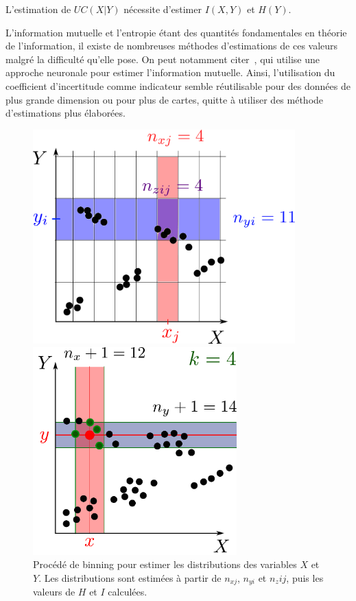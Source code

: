 L'estimation de $UC(X|Y)$ nécessite d'estimer $I(X,Y)$ et $H(Y)$.

L'information mutuelle et l'entropie étant des quantités fondamentales en théorie de l'information, il existe de nombreuses méthodes d'estimations de ces valeurs malgré la difficulté qu'elle pose. On peut notamment citer~\cite{Belghazi2018MutualIN}, qui utilise une approche neuronale pour estimer l'information mutuelle. Ainsi, l'utilisation du coefficient d'incertitude comme indicateur semble réutilisable pour des données de plus grande dimension ou pour plus de cartes, quitte à utiliser des méthode d'estimations plus élaborées. 

\begin{figure}
\begin{minipage}{0.45\textwidth}
\centering
\includegraphics[width=0.9\textwidth]{boxes}
\caption{Procédé de binning pour estimer les distributions des variables $X$ et $Y$. Les distributions sont estimées à partir de $n_{xj}$, $n_{yi}$ et $n_z{ij}$, puis les valeurs de $H$ et $I$ calculées.}
\label{fig:binning} 
\end{minipage}
\hfill
\begin{minipage}{0.45\textwidth}
\centering
\includegraphics[width=0.7\textwidth]{kraskov}

\end{minipage}
\end{figure}
